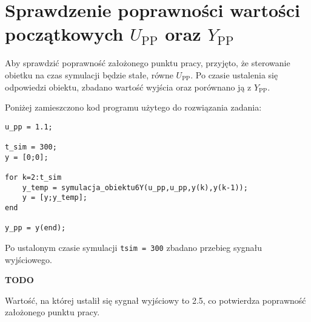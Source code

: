 \chapter{Sprawdzenie poprawności wartości początkowych $U_{\textrm{PP}}$ oraz $Y_{\textrm{PP}}$}

Aby sprawdzić poprawność założonego punktu pracy, przyjęto, że sterowanie obietku na czas symulacji będzie stałe, równe $U_{\textrm{PP}}$. Po czasie ustalenia się odpowiedzi obiektu, zbadano wartość wyjścia oraz porównano ją z $Y_{\textrm{PP}}$.

\par Poniżej zamieszczono kod programu użytego do rozwiązania zadania:
\begin{lstlisting}[style=Matlab-editor]
%wyznaczanie y_pp dla u_pp = 1.1
u_pp = 1.1;

t_sim = 300;
y = [0;0];

for k=2:t_sim
    y_temp = symulacja_obiektu6Y(u_pp,u_pp,y(k),y(k-1));
    y = [y;y_temp];
end

y_pp = y(end);
\end{lstlisting}

Po ustalonym czasie symulacji \texttt{t\textunderscore sim = 300} zbadano przebieg sygnału wyjściowego.

\par \textbf{TODO}

Wartość, na której ustalił się sygnał wyjściowy to \num{2.5}, co potwierdza poprawność założonego punktu pracy.